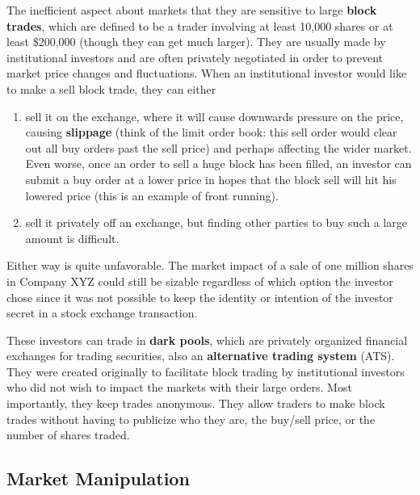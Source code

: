 \documentclass{article}
\begin{document}
    The inefficient aspect about markets that they are sensitive to large \textbf{block trades}, which are defined to be a trader involving at least 10,000 shares or at least \$200,000 (though they can get much larger). They are usually made by institutional investors and are often privately negotiated in order to prevent market price changes and fluctuations. When an institutional investor would like to make a sell block trade, they can either 
    \begin{enumerate}
        \item sell it on the exchange, where it will cause downwards pressure on the price, causing \textbf{slippage} (think of the limit order book: this sell order would clear out all buy orders past the sell price) and perhaps affecting the wider market. Even worse, once an order to sell a huge block has been filled, an investor can submit a buy order at a lower price in hopes that the block sell will hit his lowered price (this is an example of front running). 
        \item sell it privately off an exchange, but finding other parties to buy such a large amount is difficult. 
    \end{enumerate}
    Either way is quite unfavorable. The market impact of a sale of one million shares in Company XYZ could still be sizable regardless of which option the investor chose since it was not possible to keep the identity or intention of the investor secret in a stock exchange transaction. 

    These investors can trade in \textbf{dark pools}, which are privately organized financial exchanges for trading securities, also an \textbf{alternative trading system} (ATS). They were created originally to facilitate block trading by institutional investors who did not wish to impact the markets with their large orders. Most importantly, they keep trades anonymous. They allow traders to make block trades without having to publicize who they are, the buy/sell price, or the number of shares traded. 

  \subsection{Market Manipulation}
\end{document}

